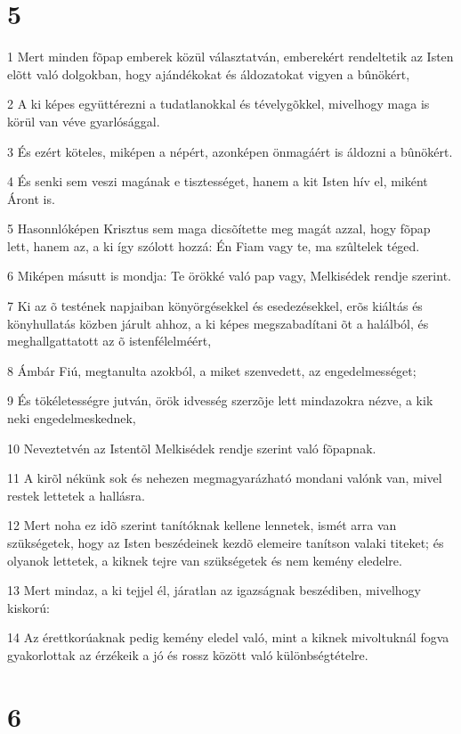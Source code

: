 \chapter{5}

\par 1 Mert minden fõpap emberek közül választatván, emberekért rendeltetik az Isten elõtt való dolgokban, hogy ajándékokat és áldozatokat vigyen a bûnökért,
\par 2 A ki képes együttérezni a tudatlanokkal és tévelygõkkel, mivelhogy maga is körül van véve gyarlósággal.
\par 3 És ezért köteles, miképen a népért, azonképen önmagáért is áldozni a bûnökért.
\par 4 És senki sem veszi magának e tisztességet, hanem a kit Isten hív el, miként Áront is.
\par 5 Hasonnlóképen Krisztus sem maga dicsõítette meg magát azzal, hogy fõpap lett, hanem az, a ki így szólott hozzá: Én Fiam vagy te, ma szûltelek téged.
\par 6 Miképen másutt is mondja: Te örökké való pap vagy, Melkisédek rendje szerint.
\par 7 Ki az õ testének napjaiban könyörgésekkel és esedezésekkel, erõs kiáltás és könyhullatás közben járult ahhoz, a ki képes megszabadítani õt a halálból, és meghallgattatott  az õ istenfélelméért,
\par 8 Ámbár Fiú, megtanulta azokból, a miket szenvedett, az engedelmességet;
\par 9 És tökéletességre jutván, örök idvesség szerzõje lett mindazokra nézve, a kik neki engedelmeskednek,
\par 10 Neveztetvén az Istentõl Melkisédek rendje szerint való fõpapnak.
\par 11 A kirõl nékünk sok és nehezen megmagyarázható mondani valónk van, mivel restek lettetek a hallásra.
\par 12 Mert noha ez idõ szerint tanítóknak kellene lennetek, ismét arra van szükségetek, hogy az Isten beszédeinek kezdõ elemeire tanítson valaki titeket; és olyanok lettetek, a kiknek tejre van szükségetek és nem kemény eledelre.
\par 13 Mert mindaz, a ki tejjel él, járatlan az igazságnak beszédiben, mivelhogy kiskorú:
\par 14 Az érettkorúaknak pedig kemény eledel való, mint a kiknek mivoltuknál fogva gyakorlottak az érzékeik a jó és rossz között való különbségtételre.

\chapter{6}

